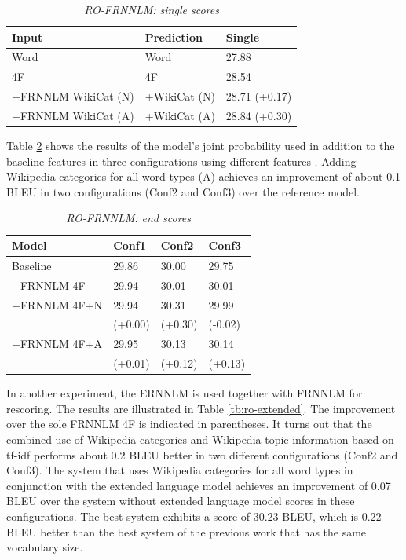 \documentclass[a4paper]{article}
\begin{document}
\begin{table}
\caption{\it RO-FRNNLM: single scores}
\vspace{2mm}
\centering
  \begin{tabular}{lll}
  	\hline
  	Input               & Prediction   & Single        \\ \hline\hline
  	Word                & Word         & 27.88         \\
  	4F                  & 4F           & 28.54         \\ \hline
  	+FRNNLM WikiCat (N) & +WikiCat (N) & 28.71 (+0.17) \\
  	+FRNNLM WikiCat (A) & +WikiCat (A) & 28.84 (+0.30)
  \end{tabular}
  \label{tb:ro-factored-single}
\end{table}

Table \ref{tb:ro-factored-combi} shows the results of the model's joint probability used in addition to the baseline features in three configurations using different features \cite{niehuesusing}. 
Adding Wikipedia categories for all word types (A) achieves an improvement of about 0.1 BLEU in two configurations (Conf2 and Conf3) over the reference model.


\begin{table}
\caption{\it RO-FRNNLM: end scores}
\vspace{2mm}
\centering
  \begin{tabular}{llll}
  	\hline
  	Model        & Conf1   & Conf2   & Conf3   \\ \hline\hline
  	Baseline     & 29.86   & 30.00   & 29.75   \\
  	+FRNNLM 4F   & 29.94   & 30.01   & 30.01   \\ \hline
  	+FRNNLM 4F+N & 29.94   & 30.31   & 29.99   \\
  	             & (+0.00) & (+0.30) & (-0.02) \\
  	+FRNNLM 4F+A & 29.95   & 30.13   & 30.14   \\
  	             & (+0.01) & (+0.12) & (+0.13)
  \end{tabular}
  \label{tb:ro-factored-combi}
\end{table}

In another experiment, the ERNNLM is used together with FRNNLM for rescoring. The results are illustrated in Table \ref{tb:ro-extended}. The improvement over the sole FRNNLM 4F is indicated in parentheses. It turns out that the combined use of Wikipedia categories and Wikipedia topic information based on tf-idf performs about 0.2 BLEU better in two different configurations (Conf2 and Conf3). The system that uses Wikipedia categories for all word types in conjunction with the extended language model achieves an improvement of 0.07 BLEU over the system without extended language model scores in these configurations.
The best system exhibits a score of 30.23 BLEU, which is 0.22 BLEU better than the best system of the previous work \cite{niehuesusing} that has the same vocabulary size.
\end{document}
